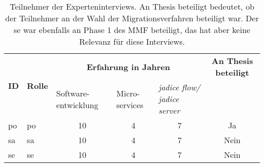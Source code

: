 \begin{table}[!ht]
  \centering
  \begin{tabular}{|l|l| p{1.8cm} p{1.5cm} p{2cm}|c|}
    \toprule
    \multirow{2}{*}[0cm]{\textbf{ID}} & \multirow{2}{*}[0cm]{\textbf{Rolle}} & \multicolumn{3}{c|}{\textbf{Erfahrung in Jahren}} & \textbf{An Thesis beteiligt} \\
     & & Software-entwicklung & Micro-services & \emph{jadice flow/ jadice server} & \\ \midrule
    \acrshort{po} & \acrlong{po} & \multicolumn{1}{c}{10} & \multicolumn{1}{c}{4} & \multicolumn{1}{c|}{7} & Ja \\
    \acrshort{sa} & \acrlong{sa}       & \multicolumn{1}{c}{10} & \multicolumn{1}{c}{4} & \multicolumn{1}{c|}{7} & Nein \\
   \acrshort{se} & \acrlong{se}     & \multicolumn{1}{c}{10} & \multicolumn{1}{c}{4} & \multicolumn{1}{c|}{7} & Nein \\
    \bottomrule
  \end{tabular}
  \caption[Teilnehmer der Experteninterviews]{
    Teilnehmer der Experteninterviews.
    An Thesis beteiligt bedeutet, ob der Teilnehmer an der Wahl der Migrationsverfahren beteiligt war.
    Der \acrshort{se} war ebenfalls an Phase 1 des MMF beteiligt, das hat aber keine Relevanz für diese Interviews.
  }
  \label{tab:expert-interviewees}
\end{table}
